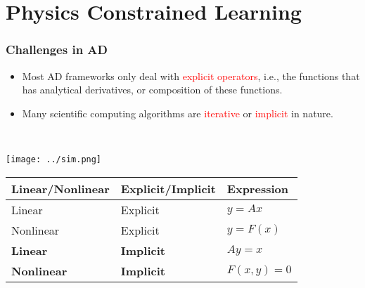 \documentclass[usenames,dvipsnames]{beamer}
\begin{document}


\section{Physics Constrained Learning}
\begin{frame}


	\frametitle{Challenges in AD}
	
	
	\begin{minipage}[t]{0.49\textwidth}
	\vspace{-3cm}
\begin{itemize}
	\item Most AD frameworks only deal with \textcolor{red}{explicit operators}, i.e., the functions that has analytical derivatives, or composition of these functions. 
	\item Many scientific computing algorithms are \textcolor{red}{iterative} or \textcolor{red}{implicit} in nature.
\end{itemize}
\end{minipage}~
\begin{minipage}[t]{0.49\textwidth}
  \texttt{[image: ../sim.png]}
\end{minipage}

\begin{table}[]
\begin{tabular}{@{}lll@{}}
\toprule
Linear/Nonlinear & Explicit/Implicit & Expression   \\ \midrule
Linear           & Explicit          & $y=Ax$       \\
Nonlinear        & Explicit          & $y = F(x)$   \\
\textbf{Linear}           & \textbf{Implicit}          & $Ay = x$     \\
\textbf{Nonlinear}        & \textbf{Implicit}          & $F(x,y) = 0$ \\ \bottomrule
\end{tabular}
\end{table}
\end{frame}
\end{document}

